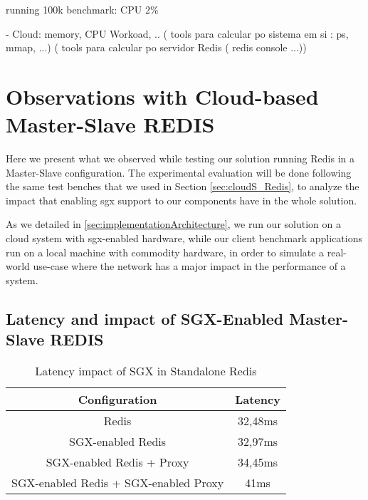 running 100k benchmark: CPU 2\%

-	Cloud:    memory,  CPU Workoad, ..    
( tools para calcular po sistema em si : ps,   mmap,    ...)  
( tools para calcular po servidor Redis ( redis console ...))

\section{Observations with Cloud-based Master-Slave REDIS}
\label{sec:cloud_MS_Redis}

Here we present what we observed while testing our solution running Redis in a Master-Slave configuration. The experimental evaluation will be done following the same test benches that we used in Section \ref{sec:cloudS_Redis}, to analyze the impact that enabling \gls{sgx} support to our components have in the whole solution.

As we detailed in \ref{sec:implementationArchitecture}, we run our solution on a cloud system with \gls{sgx}-enabled hardware, while our client benchmark applications run on a local machine with commodity hardware, in order to simulate a real-world use-case where the network has a major impact in the performance of a system.


\subsection{Latency and impact of SGX-Enabled Master-Slave REDIS}

\begin{table}[ht]
	\caption{Latency impact of SGX in Standalone Redis} %
	\centering %
	\begin{tabular}{c c} %
		\hline\hline %
		\textbf{Configuration} & \textbf{Latency} \\ [0.5ex] %
		\hline
		Redis & 32,48ms\\
		\hline
		SGX-enabled Redis & 32,97ms \\
		\hline
		SGX-enabled Redis + Proxy & 34,45ms \\
		\hline %
		SGX-enabled Redis + SGX-enabled Proxy & 41ms\\ [1ex] %
		\hline %
	\end{tabular}
	\label{table:latencyMasterSlaveRedis} %
\end{table}


